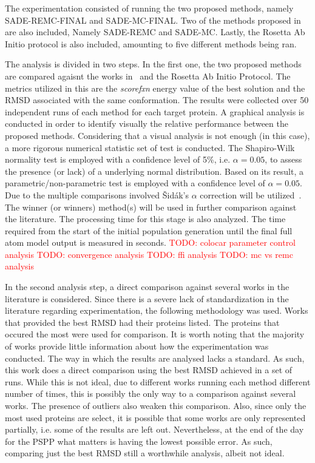 The experimentation consisted of running the two proposed methods, namely
SADE-REMC-FINAL and SADE-MC-FINAL. Two of the methods proposed
in~\cite{silva2019self} are also included, Namely SADE-REMC and SADE-MC.
Lastly, the Rosetta Ab Initio protocol is also included, amounting to five
different methods being ran.

The analysis is divided in two steps. In the first one, the two proposed methods
are compared agaisnt the works in~\cite{silva2019self} and the Rosetta Ab Initio
Protocol.
The metrics utilized in this are the \textit{scorefxn} energy value of the
best solution and the \ac{RMSD} associated with the same conformation. The
results were collected over 50 independent runs of each method for each target
protein. A graphical analysis is conducted in order to identify visually the
relative performance between the proposed methods. Considering that a visual
analysis is not enough (in this case), a more rigorous numerical statistic set
of test is conducted.  The Shapiro-Wilk~\cite{wilk1968joint} normality test is
employed with a confidence level of 5\%, i.e. $\alpha = 0.05$, to assess the
presence (or lack) of a underlying normal distribution. Based on its result, a
parametric/non-parametric test is employed with a confidence level of $\alpha =
0.05$. Due to the multiple comparisons involved \v{S}idák's $\alpha$ correction
will be utilized~\cite{vsidak1967rectangular}. The winner (or winners)
method(s) will be used in further comparison against the literature. The
processing time for this stage is also analyzed. The time required from the
start of the initial population generation until the final full atom model
output is measured in seconds.
\textcolor{red}{TODO: colocar parameter control analysis}
\textcolor{red}{TODO: convergence analysis}
\textcolor{red}{TODO: ffi analysis}
\textcolor{red}{TODO: mc vs remc analysis}

In the second analysis step, a direct comparison against several works in the
literature is considered. Since there is a severe lack of standardization in the
literature regarding experimentation, the following methodology was used. Works
that provided the best RMSD had their proteins listed. The proteins that occured
the most were used for comparison. It is worth noting that the majority of works
provide little information about how the experimentation was conducted. The way
in which the results are analysed lacks a standard. As such, this work does a
direct comparison using the best RMSD achieved in a set of runs. While this is
not ideal, due to different works running each method different number of times,
this is possibly the only way to a comparison against several works. The presence
of outliers also weaken this comparison. Also, since only the most used proteins
are select, it is possible that some works are only represented partially, i.e.
some of the results are left out. Nevertheless, at the end of the day for the
PSPP what matters is having the lowest possible error. As such, comparing just
the best RMSD still a worthwhile analysis, albeit not ideal.

